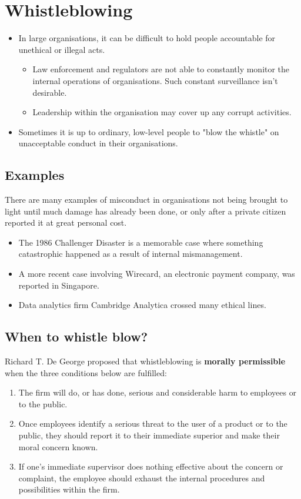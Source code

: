 \documentclass[11pt]{article}
\begin{document}
\section{Whistleblowing}
\label{sec:orgbb9180f}
\begin{itemize}
\item In large organisations, it can be difficult to hold people accountable for unethical or illegal acts.
\begin{itemize}
\item Law enforcement and regulators are not able to constantly monitor the internal operations of organisations. Such constant surveillance isn't desirable.
\item Leadership within the organisation may cover up any corrupt activities.
\end{itemize}
\item Sometimes it is up to ordinary, low-level people to "blow the whistle" on unacceptable conduct in their organisations.
\end{itemize}

\subsection{Examples}
\label{sec:org87157ea}
There are many examples of misconduct in organisations not being brought to light until much damage has already been done, or only after a private citizen reported it at great personal cost.
\begin{itemize}
\item The 1986 Challenger Disaster is a memorable case where something catastrophic happened as a result of internal mismanagement.
\item A more recent case involving Wirecard, an electronic payment company, was reported in Singapore.
\item Data analytics firm Cambridge Analytica crossed many ethical lines.
\end{itemize}

\subsection{When to whistle blow?}
\label{sec:orgdeadc8e}
Richard T. De George proposed that whistleblowing is \textbf{morally permissible} when the three conditions below are fulfilled:
\begin{enumerate}
\item The firm will do, or has done, serious and considerable harm to employees or to the public.
\item Once employees identify a serious threat to the user of a product or to the public, they should report it to their immediate superior and make their moral concern known.
\item If one's immediate supervisor does nothing effective about the concern or complaint, the employee should exhaust the internal procedures and possibilities within the firm.
\end{enumerate}
\end{document}
